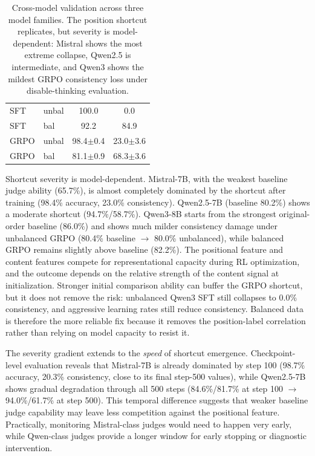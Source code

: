 \documentclass[letterpaper]{article}
\begin{document}
\begin{table}[htbp]
\begin{tabular}{llcc}
SFT & unbal & 100.0 & 0.0 \\
SFT & bal & 92.2 & 84.9 \\
GRPO & unbal & 98.4{\scriptsize$\pm$0.4} & 23.0{\scriptsize$\pm$3.6} \\
GRPO & bal & 81.1{\scriptsize$\pm$0.9} & 68.3{\scriptsize$\pm$3.6} \\
\bottomrule
\end{tabular}
\caption{Cross-model validation across three model families. The position shortcut replicates, but severity is model-dependent: Mistral shows the most extreme collapse, Qwen2.5 is intermediate, and Qwen3 shows the mildest GRPO consistency loss under disable-thinking evaluation.}
\label{tab:crossmodel}
\end{table}

Shortcut severity is model-dependent. Mistral-7B, with the weakest baseline judge ability (65.7\%), is almost completely dominated by the shortcut after training (98.4\% accuracy, 23.0\% consistency). Qwen2.5-7B (baseline 80.2\%) shows a moderate shortcut (94.7\%/58.7\%). Qwen3-8B starts from the strongest original-order baseline (86.0\%) and shows much milder consistency damage under unbalanced GRPO (80.4\% baseline $\to$ 80.0\% unbalanced), while balanced GRPO remains slightly above baseline (82.2\%). The positional feature and content features compete for representational capacity during RL optimization, and the outcome depends on the relative strength of the content signal at initialization. Stronger initial comparison ability can buffer the GRPO shortcut, but it does not remove the risk: unbalanced Qwen3 SFT still collapses to 0.0\% consistency, and aggressive learning rates still reduce consistency. Balanced data is therefore the more reliable fix because it removes the position-label correlation rather than relying on model capacity to resist it.

The severity gradient extends to the \emph{speed} of shortcut emergence. Checkpoint-level evaluation reveals that Mistral-7B is already dominated by step 100 (98.7\% accuracy, 20.3\% consistency, close to its final step-500 values), while Qwen2.5-7B shows gradual degradation through all 500 steps (84.6\%/81.7\% at step 100 $\to$ 94.0\%/61.7\% at step 500). This temporal difference suggests that weaker baseline judge capability may leave less competition against the positional feature. Practically, monitoring Mistral-class judges would need to happen very early, while Qwen-class judges provide a longer window for early stopping or diagnostic intervention.
\end{document}
